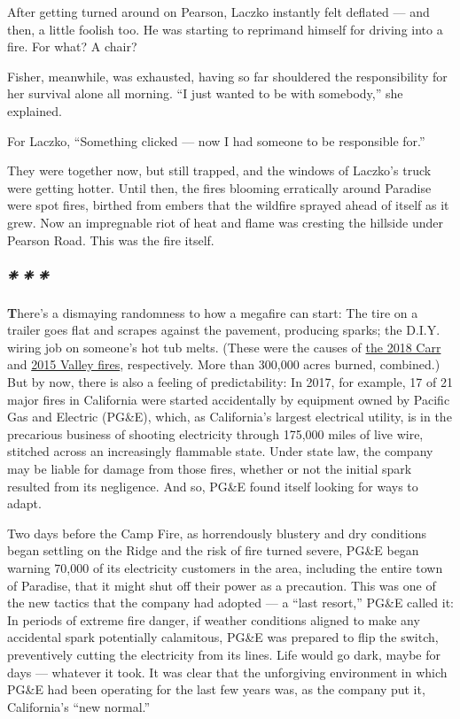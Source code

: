 After getting turned around on Pearson, Laczko instantly felt deflated
--- and then, a little foolish too. He was starting to reprimand himself
for driving into a fire. For what? A chair?

Fisher, meanwhile, was exhausted, having so far shouldered the
responsibility for her survival alone all morning. ``I just wanted to be
with somebody,'' she explained.

For Laczko, ``Something clicked --- now I had someone to be responsible
for.''

They were together now, but still trapped, and the windows of Laczko's
truck were getting hotter. Until then, the fires blooming erratically
around Paradise were spot fires, birthed from embers that the wildfire
sprayed ahead of itself as it grew. Now an impregnable riot of heat and
flame was cresting the hillside under Pearson Road. This was the fire
itself.

\hypertarget{---4}{%
\subparagraph{❈ ❈ ❈}\label{---4}}

\textbf{T}here's a dismaying randomness to how a megafire can start: The
tire on a trailer goes flat and scrapes against the pavement, producing
sparks; the D.I.Y. wiring job on someone's hot tub melts. (These were
the causes of
\href{https://www.nytimes3xbfgragh.onion/2018/07/31/us/carr-fires-california-explained.html}{the
2018 Carr} and
\href{https://www.latimes.com/local/lanow/la-me-ln-napa-wildfire-hot-tub-20160810-snap-story.html}{2015
Valley fires}, respectively. More than 300,000 acres burned, combined.)
But by now, there is also a feeling of predictability: In 2017, for
example, 17 of 21 major fires in California were started accidentally by
equipment owned by Pacific Gas and Electric (PG\&E), which, as
California's largest electrical utility, is in the precarious business
of shooting electricity through 175,000 miles of live wire, stitched
across an increasingly flammable state. Under state law, the company may
be liable for damage from those fires, whether or not the initial spark
resulted from its negligence. And so, PG\&E found itself looking for
ways to adapt.

Two days before the Camp Fire, as horrendously blustery and dry
conditions began settling on the Ridge and the risk of fire turned
severe, PG\&E began warning 70,000 of its electricity customers in the
area, including the entire town of Paradise, that it might shut off
their power as a precaution. This was one of the new tactics that the
company had adopted --- a ``last resort,'' PG\&E called it: In periods
of extreme fire danger, if weather conditions aligned to make any
accidental spark potentially calamitous, PG\&E was prepared to flip the
switch, preventively cutting the electricity from its lines. Life would
go dark, maybe for days --- whatever it took. It was clear that the
unforgiving environment in which PG\&E had been operating for the last
few years was, as the company put it, California's ``new normal.''

